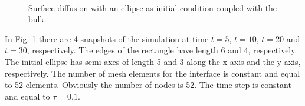 \documentclass[a4paper,11pt, onecolumn]{article}
\begin{document}
\begin{figure}[htbp]
  \centering
  \quad
  \\
  \quad
  \caption{Surface diffusion with an ellipse as initial condition coupled with the bulk.}
  \label{fig:sd_ellipse_bulk}
\end{figure}

\noindent In Fig. \ref{fig:sd_ellipse_bulk} there are 4 snapshots of the simulation at time $t=5$, $t=10$, $t=20$ and $t=30$, respectively. The edges of the rectangle have length 6 and 4, respectively. The initial ellipse has semi-axes of length 5 and 3 along the x-axis and the y-axis, respectively. The number of mesh elements for the interface is constant and equal to 52 elements. Obviously the number of nodes is 52. The time step is constant and equal to $\tau=0.1$.
\newline
\end{document}
